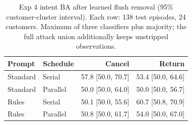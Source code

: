 \begin{table}[t]\centering\footnotesize\setlength{\tabcolsep}{3pt}
\caption{Exp 4 intent BA after learned flush removal (95\% customer-cluster interval). Each row: 138 test episodes, 24 customers. Maximum of three classifiers plus majority; the full attack union additionally keeps unstripped observations.}\label{tab:r8-flush}
\begin{tabular}{@{}llrr@{}}\toprule
Prompt & Schedule & Cancel & Return\\\midrule
Standard & Serial & 57.8 [50.0, 70.7] & 53.4 [50.0, 64.6]\\
Standard & Parallel & 50.0 [50.0, 64.0] & 50.0 [50.0, 56.7]\\
Rules & Serial & 50.1 [50.0, 55.6] & 60.7 [50.8, 70.9]\\
Rules & Parallel & 50.8 [50.0, 61.7] & 54.0 [50.0, 67.0]\\
\bottomrule\end{tabular}\end{table}
